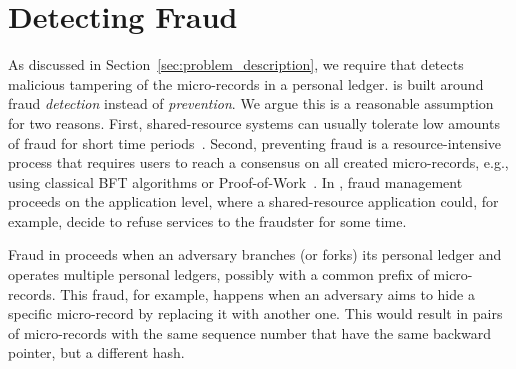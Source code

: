 \section{Detecting Fraud}
\label{sec:detecting_fraud}
As discussed in Section~\ref{sec:problem_description}, we require that \ModelName{} detects malicious tampering of the micro-records in a personal ledger.
\ModelName{} is built around fraud \emph{detection} instead of \emph{prevention}.
We argue this is a reasonable assumption for two reasons.
First, shared-resource systems can usually tolerate low amounts of fraud for short time periods~\cite{krishnan2002virtual}.
Second, preventing fraud is a resource-intensive process that requires users to reach a consensus on all created micro-records, e.g., using classical BFT algorithms or Proof-of-Work~\cite{vukolic2015quest}.
In \ModelName{}, fraud management proceeds on the application level, where a shared-resource application could, for example, decide to refuse services to the fraudster for some time.

Fraud in \ModelName{} proceeds when an adversary branches (or forks) its personal ledger and operates multiple personal ledgers, possibly with a common prefix of micro-records.
This fraud, for example, happens when an adversary aims to hide a specific micro-record by replacing it with another one.
This would result in pairs of micro-records with the same sequence number that have the same backward pointer, but a different hash.



